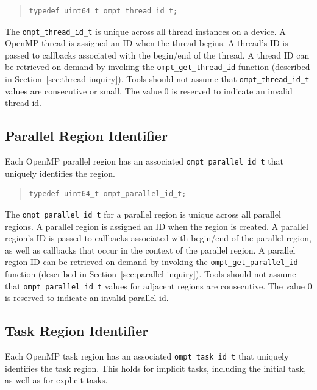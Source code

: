 \documentclass{article}
\begin{document}
\begin{quote}
\begin{verbatim}
typedef uint64_t ompt_thread_id_t;
\end{verbatim}
\end{quote}

\noindent
  The \verb|ompt_thread_id_t| is unique
  across all thread instances on a device.  A OpenMP thread is assigned an ID
  when the thread begins. A thread's ID is
  passed to callbacks associated with the begin/end of the
  thread. A thread ID can be retrieved
  on demand by invoking the  \verb|ompt_get_thread_id|   
  function (described in Section~\ref{sec:thread-inquiry}).
  Tools should not assume that \verb|ompt_thread_id_t| values are consecutive or small. 
  The value 0 is reserved to indicate an invalid thread id.



\subsection{Parallel Region Identifier}
  Each OpenMP parallel region has an associated
  \verb|ompt_parallel_id_t| that uniquely identifies the region.

\begin{quote}
\begin{verbatim}
typedef uint64_t ompt_parallel_id_t;
\end{verbatim}
\end{quote}

\noindent
  The \verb|ompt_parallel_id_t| for a parallel region is unique
  across all parallel regions.  A parallel region is assigned an ID
  when the region is created. A parallel region's ID is
  passed to callbacks associated with begin/end of the
  parallel region, as well as callbacks that occur in the context of the parallel region.
  A parallel region ID can be retrieved
  on demand by invoking the \verb|ompt_get_parallel_id|  function (described in Section~\ref{sec:parallel-inquiry}).
  Tools should not assume that \verb|ompt_parallel_id_t| values for adjacent
  regions are consecutive. 
  The value 0 is reserved to indicate an invalid parallel id.
 
 
  \subsection{Task Region Identifier}
  Each OpenMP task region has an associated
  \verb|ompt_task_id_t| that uniquely identifies the task region. 
  This holds for implicit tasks, including the initial task, as well as for explicit tasks.
\end{document}
